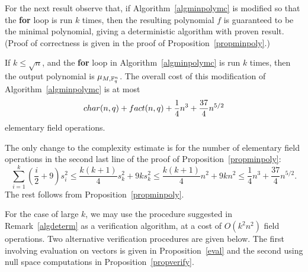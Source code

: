 For the next result observe that, if Algorithm~\ref{algminpolymc} 
is modified so that the {\bf for} loop is run $k$ times, then the resulting 
polynomial $f$ is guaranteed to be the minimal polynomial, giving a deterministic
algorithm with proven result. (Proof of correctness 
is given in the proof of Proposition~\ref{propminpoly}.)

\begin{Prop}
\label{veryfewvectors}
If $k \le \sqrt{n}$,  and the {\bf for} loop in 
Algorithm~\ref{algminpolymc} is run $k$ times, then the output polynomial
is $\mu_{M,\mathbb{F}_q^n}$. The 
overall cost of this modification of Algorithm~\ref{algminpolymc} is at most
\[ {\rm char}(n,q) + {\rm fact}(n,q) + \frac{1}{4}n^3+\frac{37}{4} n^{5/2} \]
elementary field operations.
\end{Prop}
\proofbeg The only change 
to the complexity estimate is for the number of elementary field operations 
in the second last line of the proof of Proposition~\ref{propminpoly}:
\[
\sum_{i=1}^k(\frac{i}{2}+9)s_i^2 \leq \frac{k(k+1)}{4}s_k^2+9ks_k^2
\leq \frac{k(k+1)}{4}n^2+9kn^2\le \frac{1}{4}n^3+\frac{37}{4} n^{5/2}.
\]
The rest follows from Proposition~\ref{propminpoly}.
\proofend

\medskip
For the case of large $k$, we may use the procedure suggested in
Remark~\ref{algdeterm} as a verification algorithm, at a cost of
$O(k^2n^2)$ field operations. Two alternative verification procedures
%
are given below. The first involving evaluation on vectors is given in
Proposition~\ref{eval} and the second using null space computations
in Proposition~\ref{propverify}.

